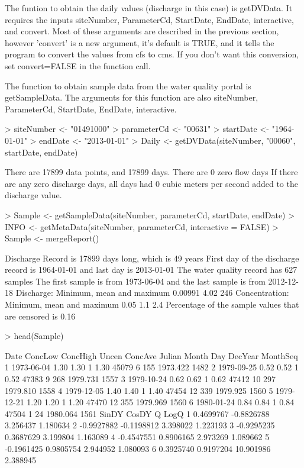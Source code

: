\documentclass[a4paper,11pt]{article}
\begin{document}
The funtion to obtain the daily values (discharge in this case) is getDVData.  It requires the inputs siteNumber, ParameterCd, StartDate, EndDate, interactive, and convert. Most of these arguments are described in the previous section, however 'convert' is a new argument, it's default is TRUE, and it tells the program to convert the values from cfs to cms. If you don't want this conversion, set convert=FALSE in the function call.

The function to obtain sample data from the water quality portal is getSampleData. The arguments for this function are also siteNumber, ParameterCd, StartDate, EndDate, interactive.



\begin{Schunk}
\begin{Sinput}
> siteNumber <- "01491000"
> parameterCd <- "00631"
> startDate <- "1964-01-01"
> endDate <- "2013-01-01"
> Daily <- getDVData(siteNumber, "00060", startDate, endDate)
\end{Sinput}
\begin{Soutput}
There are  17899 data points, and  17899 days.
There are  0 zero flow days
If there are any zero discharge days, all days had 0 cubic meters per second added to the discharge value.
\end{Soutput}
\begin{Sinput}
> Sample <- getSampleData(siteNumber, parameterCd, startDate, endDate)
> INFO <- getMetaData(siteNumber, parameterCd, interactive = FALSE)
> Sample <- mergeReport()
\end{Sinput}
\begin{Soutput}
 Discharge Record is 17899 days long, which is 49 years
 First day of the discharge record is 1964-01-01 and last day is 2013-01-01
 The water quality record has 627 samples
 The first sample is from 1973-06-04 and the last sample is from 2012-12-18
 Discharge: Minimum, mean and maximum 0.00991 4.02 246
 Concentration: Minimum, mean and maximum 0.05 1.1 2.4
 Percentage of the sample values that are censored is 0.16 %
\end{Soutput}
\begin{Sinput}
> head(Sample)
\end{Sinput}
\begin{Soutput}
        Date ConcLow ConcHigh Uncen ConcAve Julian Month Day  DecYear MonthSeq
1 1973-06-04    1.30     1.30     1    1.30  45079     6 155 1973.422     1482
2 1979-09-25    0.52     0.52     1    0.52  47383     9 268 1979.731     1557
3 1979-10-24    0.62     0.62     1    0.62  47412    10 297 1979.810     1558
4 1979-12-05    1.40     1.40     1    1.40  47454    12 339 1979.925     1560
5 1979-12-21    1.20     1.20     1    1.20  47470    12 355 1979.969     1560
6 1980-01-24    0.84     0.84     1    0.84  47504     1  24 1980.064     1561
       SinDY      CosDY         Q     LogQ
1  0.4699767 -0.8826788  3.256437 1.180634
2 -0.9927882 -0.1198812  3.398022 1.223193
3 -0.9295235  0.3687629  3.199804 1.163089
4 -0.4547551  0.8906165  2.973269 1.089662
5 -0.1961425  0.9805754  2.944952 1.080093
6  0.3925740  0.9197204 10.901986 2.388945
\end{Soutput}
\end{Schunk}
\end{document}
